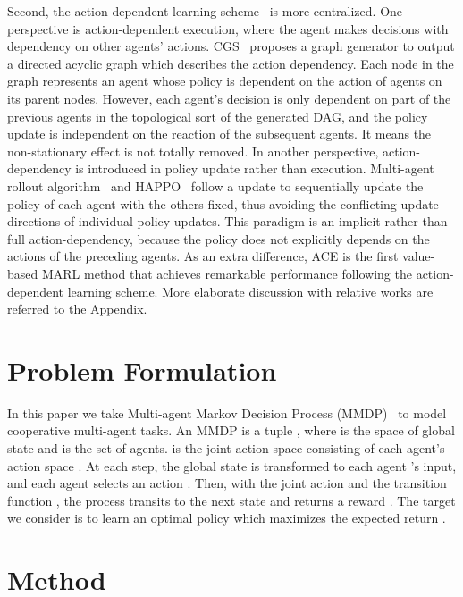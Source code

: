 \documentclass[letterpaper]{article} \usepackage{aaai23}  \usepackage{times}  \usepackage{helvet}  \usepackage{courier}  \usepackage[hyphens]{url}  \usepackage{graphicx} \urlstyle{rm} \def\UrlFont{\rm}  \usepackage{natbib}  \usepackage{caption} \frenchspacing  \setlength{\pdfpagewidth}{8.5in} \setlength{\pdfpageheight}{11in} \usepackage{algorithm}
\begin{document}
Second, the action-dependent learning scheme~\citeyear{multiagent_rollout,happo,gcs,kuba2021settling, ye2022towards, kuba2022heterogeneous, fu2022revisiting} is more centralized. One perspective is action-dependent execution, where the agent makes decisions with dependency on other agents’ actions. CGS~\citeyear{gcs} proposes a graph generator to output a directed acyclic graph which describes the action dependency. Each node in the graph represents an agent whose policy is dependent on the action of agents on its parent nodes. However, each agent's decision is only dependent on part of the previous agents in the topological sort of the generated DAG, and the policy update is independent on the reaction of the subsequent agents. It means the non-stationary effect is not totally removed. In another perspective, action-dependency is introduced in policy update rather than execution. Multi-agent rollout algorithm~\citeyear{multiagent_rollout} and HAPPO~\citeyear{happo} follow a update to sequentially update the policy of each agent with the others fixed, thus avoiding the conflicting update directions of individual policy updates. This paradigm is an implicit rather than full action-dependency, because the policy does not explicitly depends on the actions of the preceding agents.
As an extra difference, ACE is the first value-based MARL method that achieves remarkable performance following the action-dependent learning scheme. More elaborate discussion with relative works are referred to the Appendix.


 \vspace{-1ex}
\section{Problem Formulation}
\vspace{-0.5ex}
In this paper we take Multi-agent Markov Decision Process (MMDP)~\citeyear{markov} to model cooperative multi-agent tasks. An MMDP is a tuple 
, where  is the space of global state and  is the set of  agents.  is the joint action space consisting of each agent's action space . At each step, the global state  is transformed to each agent 's input, and each agent  selects an action . Then, with the joint action  and the transition function , the process transits to the next state  and returns a reward . The target we consider is to learn an optimal policy  which maximizes the expected return .
 \section{Method}
\end{document}
